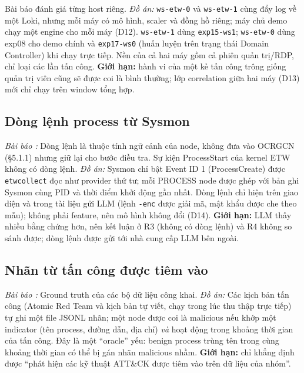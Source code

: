 Bài báo \cite{aly2025ocrapt} đánh giá từng host riêng. \textit{Đồ án:} \texttt{ws-etw-0} và \texttt{ws-etw-1} cùng đẩy log về một Loki, nhưng mỗi máy có mô hình, scaler và đồng hồ riêng; máy chủ demo chạy một engine cho mỗi máy (D12). \texttt{ws-etw-1} dùng \texttt{exp15-ws1}; \texttt{ws-etw-0} dùng exp08 cho demo chính và \texttt{exp17-ws0} (huấn luyện trên trạng thái Domain Controller) khi chạy trực tiếp. Nền của cả hai máy gồm cả phiên quản trị/RDP, chỉ loại các lần tấn công. \textbf{Giới hạn:} hành vi của một kẻ tấn công trông giống quản trị viên cũng sẽ được coi là bình thường; lớp correlation giữa hai máy (D13) mới chỉ chạy trên window tổng hợp.

\subsection{Dòng lệnh process từ Sysmon}
\label{sec:dev-cmdline}

\textit{Bài báo \cite{aly2025ocrapt}:} Dòng lệnh là thuộc tính ngữ cảnh của node, không đưa vào OCRGCN (§5.1.1) nhưng giữ lại cho bước điều tra. Sự kiện ProcessStart của kernel ETW không có dòng lệnh. \textit{Đồ án:} Sysmon chỉ bật Event ID 1 (ProcessCreate) được \texttt{etwcollect} đọc như provider thứ tư; mỗi PROCESS node được ghép với bản ghi Sysmon cùng PID và thời điểm khởi động gần nhất. Dòng lệnh chỉ hiện trên giao diện và trong tài liệu gửi LLM (lệnh \texttt{-enc} được giải mã, mật khẩu được che theo mẫu); không phải feature, nên mô hình không đổi (D14). \textbf{Giới hạn:} LLM thấy nhiều bằng chứng hơn, nên kết luận ở R3 (không có dòng lệnh) và R4 không so sánh được; dòng lệnh được gửi tới nhà cung cấp LLM bên ngoài.

\subsection{Nhãn từ tấn công được tiêm vào}
\label{sec:dev-labels}

\textit{Bài báo \cite{aly2025ocrapt}:} Ground truth của các bộ dữ liệu công khai. \textit{Đồ án:} Các kịch bản tấn công (Atomic Red Team \cite{atomic_red_team} và kịch bản tự viết, chạy trong lúc thu thập trực tiếp) tự ghi một file JSONL nhãn; một node được coi là malicious nếu khớp một indicator (tên process, đường dẫn, địa chỉ) \emph{và} hoạt động trong khoảng thời gian của tấn công. Đây là một ``oracle'' yếu: benign process trùng tên trong cùng khoảng thời gian có thể bị gán nhãn malicious nhầm. \textbf{Giới hạn:} chỉ khẳng định được ``phát hiện các kỹ thuật ATT\&CK được tiêm vào trên dữ liệu của nhóm''.

